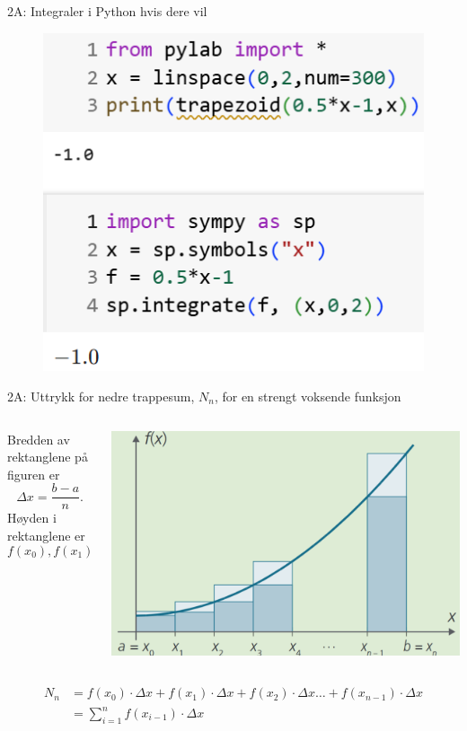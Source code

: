 \greenheader
\begin{frame}[fragile]{2A: Integraler i Python hvis dere vil}
    \warn
\begin{figure}
    \centering
    \includegraphics[width=0.5\linewidth]{R2-K2A-14.png}
\end{figure}
\end{frame}


\greenheader
\begin{frame}{2A: Uttrykk for nedre trappesum, $N_n$,  for en strengt voksende funksjon}
    \begin{columns} 
        \begin{column}{0.42\textwidth}
            Bredden av rektanglene på figuren er 
            \[
                \Delta x = \frac{b-a}{n}.
            \]
            Høyden i rektanglene er 
            \[
                f(x_0), f(x_1), f(x_2), \dots, f(x_{n-1}).
            \]
           
            
        \end{column}
        \begin{column}{0.58\textwidth}
            \centering
            \includegraphics[width=1\linewidth]{R2-K2A-15.png}
        \end{column}
    \end{columns}
    \begin{align*}
                 N_n &=  
                 f(x_0)\cdot \Delta x + f(x_1)\cdot \Delta x + f(x_2)\cdot \Delta x \dots + f(x_{n-1})\cdot \Delta x\\
                &=  \sum_{i=1}^{n} f(x_{i-1})\cdot \Delta x
            \end{align*}
\end{frame}


